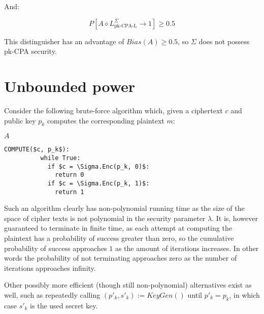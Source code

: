 \documentclass[a4paper]{scrreprt}
\begin{document}
And:

\[
	P\left[A \diamond L^\Sigma_{\text{pk-CPA-L}} \rightarrow 1\right] \geq 0.5
\]

This distinguisher has an advantage of $Bias(A) \geq 0.5$, so $\Sigma$ does not
possess pk-CPA security.

\section{Unbounded power}

Consider the following brute-force algorithm which, given a ciphertext $c$ and
public key $p_k$ computes the corresponding plaintext $m$:

\begin{library}{$A$}
	\begin{lstlisting}[mathescape=true,autogobble=true]
		COMPUTE($c, p_k$):
		  while True:
		    if $c = \Sigma.Enc(p_k, 0)$:
		      return 0
		    if $c = \Sigma.Enc(p_k, 1)$:
		      return 1
	\end{lstlisting}
\end{library}

Such an algorithm clearly has non-polynomial running time as the size of the
space of cipher texts is not polynomial in the security parameter $\lambda$.
It is, however guaranteed to terminate in finite time, as each attempt at
computing the plaintext has a probability of success greater than zero, so the
cumulative probability of success approaches $1$ as the amount of iterations
increases. In other words the probability of not terminating approaches zero as
the number of iterations approaches infinity.

Other possibly more efficient (though still non-polynomial) alternatives exist
as well, such as repeatedly  calling $(p'_k, s'_k) := KeyGen()$ until $p'_k =
p_k$, in which case $s'_k$ is the used secret key.
\end{document}

